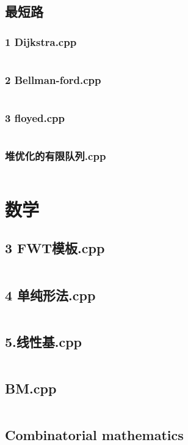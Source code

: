 \documentclass[a4paper,11pt]{article}
\begin{document}
\subsection{最短路}
\subsubsection{1 Dijkstra.cpp}
\inputminted[breaklines]{c++}{"D:/tmplz/templates/图论/最短路/1 Dijkstra.cpp"}
\subsubsection{2 Bellman-ford.cpp}
\inputminted[breaklines]{c++}{"D:/tmplz/templates/图论/最短路/2 Bellman-ford.cpp"}
\subsubsection{3 floyed.cpp}
\inputminted[breaklines]{c++}{"D:/tmplz/templates/图论/最短路/3 floyed.cpp"}
\subsubsection{堆优化的有限队列.cpp}
\inputminted[breaklines]{c++}{"D:/tmplz/templates/图论/最短路/堆优化的有限队列.cpp"}
\section{数学}
\subsection{3 FWT模板.cpp}
\inputminted[breaklines]{c++}{"D:/tmplz/templates/数学/3 FWT模板.cpp"}
\subsection{4 单纯形法.cpp}
\inputminted[breaklines]{c++}{"D:/tmplz/templates/数学/4 单纯形法.cpp"}
\subsection{5.线性基.cpp}
\inputminted[breaklines]{c++}{"D:/tmplz/templates/数学/5.线性基.cpp"}
\subsection{BM.cpp}
\inputminted[breaklines]{c++}{"D:/tmplz/templates/数学/BM.cpp"}
\subsection{Combinatorial mathematics}
\end{document}
